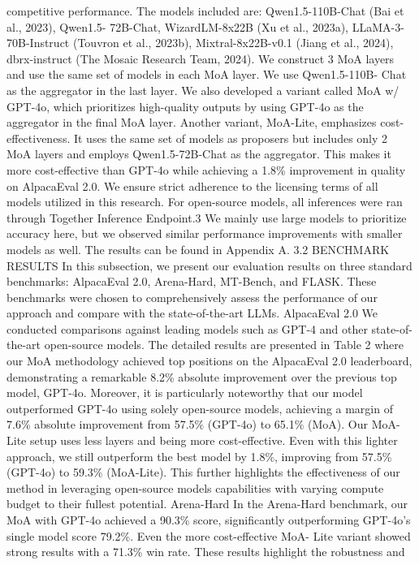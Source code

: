 competitive performance. The models included are: Qwen1.5-110B-Chat (Bai et al., 2023), Qwen1.5-
72B-Chat, WizardLM-8x22B (Xu et al., 2023a), LLaMA-3-70B-Instruct (Touvron et al., 2023b),
Mixtral-8x22B-v0.1 (Jiang et al., 2024), dbrx-instruct (The Mosaic Research Team, 2024). We
construct 3 MoA layers and use the same set of models in each MoA layer. We use Qwen1.5-110B-
Chat as the aggregator in the last layer. We also developed a variant called MoA w/ GPT-4o, which
prioritizes high-quality outputs by using GPT-4o as the aggregator in the final MoA layer. Another
variant, MoA-Lite, emphasizes cost-effectiveness. It uses the same set of models as proposers but
includes only 2 MoA layers and employs Qwen1.5-72B-Chat as the aggregator. This makes it more
cost-effective than GPT-4o while achieving a 1.8\% improvement in quality on AlpacaEval 2.0. We
ensure strict adherence to the licensing terms of all models utilized in this research. For open-source
models, all inferences were ran through Together Inference Endpoint.3 We mainly use large models
to prioritize accuracy here, but we observed similar performance improvements with smaller models
as well. The results can be found in Appendix A.
3.2
BENCHMARK RESULTS
In this subsection, we present our evaluation results on three standard benchmarks: AlpacaEval 2.0,
Arena-Hard, MT-Bench, and FLASK. These benchmarks were chosen to comprehensively assess the
performance of our approach and compare with the state-of-the-art LLMs.
AlpacaEval 2.0
We conducted comparisons against leading models such as GPT-4 and other
state-of-the-art open-source models. The detailed results are presented in Table 2 where our MoA
methodology achieved top positions on the AlpacaEval 2.0 leaderboard, demonstrating a remarkable
8.2\% absolute improvement over the previous top model, GPT-4o. Moreover, it is particularly
noteworthy that our model outperformed GPT-4o using solely open-source models, achieving a
margin of 7.6\% absolute improvement from 57.5\% (GPT-4o) to 65.1\% (MoA). Our MoA-Lite setup
uses less layers and being more cost-effective. Even with this lighter approach, we still outperform the
best model by 1.8\%, improving from 57.5\% (GPT-4o) to 59.3\% (MoA-Lite). This further highlights
the effectiveness of our method in leveraging open-source models capabilities with varying compute
budget to their fullest potential.
Arena-Hard
In the Arena-Hard benchmark, our MoA with GPT-4o achieved a 90.3\% score,
significantly outperforming GPT-4o’s single model score 79.2\%. Even the more cost-effective MoA-
Lite variant showed strong results with a 71.3\% win rate. These results highlight the robustness and
